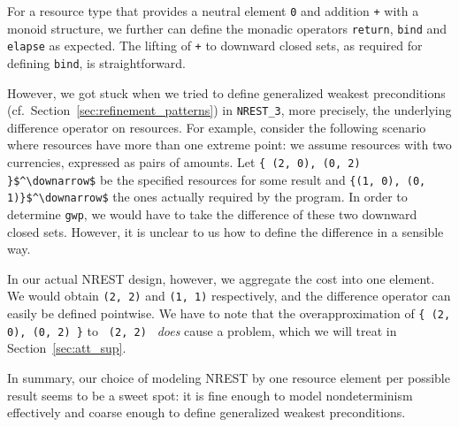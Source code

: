 \documentclass[acmsmall]{acmart}
\newcommand{\is}{\lstinline[language=isabelle]}
\newcommand{\cf}{cf.\xspace}
\newcommand{\ie}{i.\,e.\xspace}
\begin{document}
For a resource type that provides a neutral element \is{0} and addition \is{+} with a monoid structure, we further can define the monadic operators \is{return}, \is{bind} and \is{elapse} as expected.
The lifting of \is{+} to downward closed sets, as required for defining \is{bind}, is straightforward.



However, we got stuck when we tried to define generalized weakest preconditions (\cf\ Section~\ref{sec:refinement_patterns}) in \is{NREST_3}, more precisely, the underlying difference operator on resources.
For example, consider the following scenario where resources have more than one extreme point:
we assume resources with two currencies, expressed as pairs of amounts. Let \is!{ (2, 0), (0, 2) }$^\downarrow$! be the specified resources for some result and \is!{(1, 0), (0, 1)}$^\downarrow$! the
ones actually required by the program. In order to determine \is{gwp}, we would have to take the difference of these two downward closed sets. However, it is unclear to us how to define the difference in a sensible way. 


In our actual NREST design, however, we aggregate the cost into one element.
We would obtain \is{(2, 2)} and \is{(1, 1)} respectively, and the difference operator can easily be defined pointwise. 
We have to note that the overapproximation of \is!{ (2, 0), (0, 2) }! to \is{ (2, 2) } \emph{does} cause a problem, which we will treat in Section~\ref{sec:att_sup}.



In summary, our choice of modeling NREST by one resource element per possible result seems to be a sweet spot: it is fine enough to model nondeterminism effectively and coarse enough to define generalized weakest preconditions. 
\end{document}
